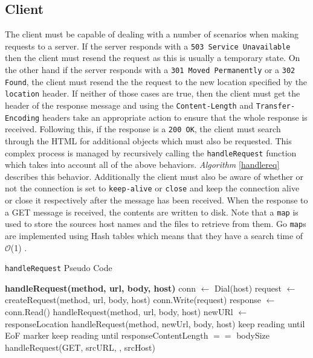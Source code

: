 \documentclass[10pt,twocolumn]{witseiepaper}
\begin{document}
	\subsection{Client}

	The client must be capable of dealing with a number of scenarios when making requests to a server. If the server responds with a \texttt{503 Service Unavailable} then the client must resend the request as this is usually a temporary state. On the other hand if the server responds with a \texttt{301 Moved Permanently} or a \texttt{302 Found}, the client must resend the the request to the new location specified by the \texttt{location} header. If neither of those cases are true, then the client must get the header of the response message and using the \texttt{Content-Length} and \texttt{Transfer-Encoding} headers take an appropriate action to ensure that the whole response is received. Following this, if the response is a \texttt{200 OK}, the client must search through the HTML for additional objects which must also be requested. This complex process is managed by recursively calling the \texttt{handleRequest} function which takes into account all of the above behaviors. \emph{Algorithm} \ref{handlereq} describes this behavior. Additionally the client must also be aware of whether or not the connection is set to \texttt{keep-alive} or \texttt{close} and keep the connection alive or close it respectively after the message has been received. When the response to a GET message is received, the contents are written to disk. Note that a \texttt{map} is used to store the sources host names and the files to retrieve from them. Go \texttt{map}s are implemented using Hash tables which means that they have a search time of $\mathcal{O}$(1) \cite{map}.

	\begin{algorithm}
	\caption{\texttt{handleRequest} Pseudo Code}
	\label{handlereq}
		\begin{algorithmic}
			\State \textbf{handleRequest(method, url, body, host)}
				\State conn $\gets$ Dial(host)
				\State request $\gets$ createRequest(method, url, body, host)
				\State conn.Write(request)
				\State response $\gets$ conn.Read()
					\State handleRequest(method, url, body, host)
					\State \Return
				\EndIf
					\State newURl $\gets$ responseLocation
					\State handleRequest(method, newUrl, body, host)
					\State \Return
				\EndIf
					\State keep reading until EoF marker
					\State keep reading until responseContentLength $==$ bodySize
				\EndIf
					\State handleRequest(GET, srcURL, , srcHost)
				\EndFor
		\end{algorithmic}
	\end{algorithm}
\end{document}
